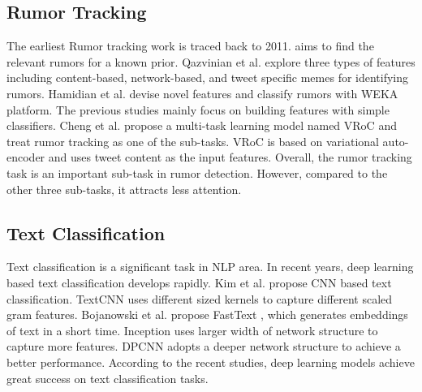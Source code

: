 \documentclass[review]{elsarticle}
\begin{document}
\subsection{Rumor Tracking}
\label{sec:rumortracking}
The earliest Rumor tracking work is traced back to 2011. \cite{DBLP:journals/csur/ZubiagaABLP18} aims to find the relevant rumors for a known prior. Qazvinian et al. \cite{DBLP:conf/emnlp/QazvinianRRM11} explore three types of features including content-based, network-based, and tweet specific memes for identifying rumors. Hamidian et al. \cite{DBLP:journals/corr/abs-1912-08926} devise novel features and classify rumors with WEKA platform. The previous studies mainly focus on building features with simple classifiers. Cheng et al. \cite{DBLP:conf/www/ChengNB20} propose a multi-task learning model named VRoC and treat rumor tracking as one of the sub-tasks. VRoC is based on variational auto-encoder and uses tweet content as the input features. Overall, the rumor tracking task is an important sub-task in rumor detection. However, compared to the other three sub-tasks, it attracts less attention.

\subsection{Text Classification}
\label{sec:textclassification}
Text classification is a significant task in NLP area. In recent years, deep learning based text classification develops rapidly. Kim et al. \cite{DBLP:conf/emnlp/Kim14} propose CNN based text classification. TextCNN uses different sized kernels to capture different scaled gram features. Bojanowski et al. propose FastText \cite{DBLP:journals/tacl/BojanowskiGJM17}, which generates embeddings of text in a short time. Inception \cite{DBLP:journals/corr/SzegedyLJSRAEVR14} uses larger width of network structure to capture more features. DPCNN \cite{DBLP:conf/acl/JohnsonZ17} adopts a deeper network structure to achieve a better performance. According to the recent studies, deep learning models achieve great success on text classification tasks.
\end{document}
